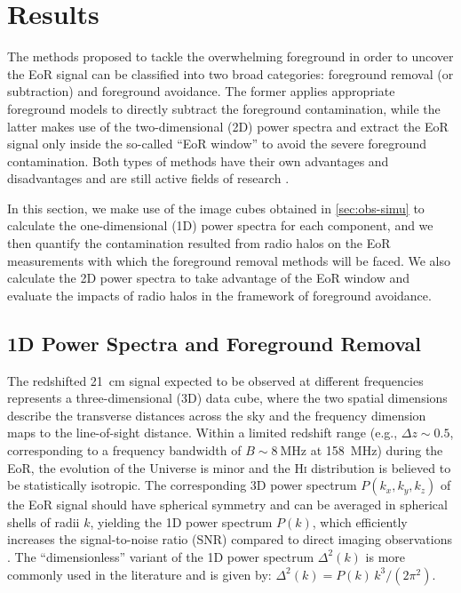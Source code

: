\documentclass[modern]{aastex62}
\newcommand{\Hi}{H\textsc{i}}
\begin{document}
\section{Results}
\label{sec:results}

{\color{cyan}%
The methods proposed to tackle the overwhelming foreground in order to
uncover the EoR signal can be classified into two broad categories:
foreground removal (or subtraction) and foreground avoidance.
The former applies appropriate foreground models to directly subtract
the foreground contamination, while the latter makes use of the
two-dimensional (2D) power spectra and extract the EoR signal only
inside the so-called \enquote{EoR window} to avoid the severe foreground
contamination.
Both types of methods have their own advantages and disadvantages and
are still active fields of research
\citep[see][and references therein]{chapman2016}.

In this section, we make use of the image cubes obtained in
\autoref{sec:obs-simu} to calculate the one-dimensional (1D) power
spectra for each component, and we then quantify the contamination
resulted from radio halos on the EoR measurements
with which the foreground removal methods will be faced.
We also calculate the 2D power spectra to take advantage of the EoR
window and evaluate the impacts of radio halos in the framework
of foreground avoidance.} %

\subsection{1D Power Spectra and Foreground Removal}
\label{sec:ps1d}

The redshifted 21~cm signal expected to be observed at different
frequencies represents a three-dimensional (3D) data cube, where the
two spatial dimensions describe the transverse distances across the sky
and the frequency dimension maps to the line-of-sight distance.
{\color{cyan}%
Within a limited redshift range (e.g., $\Delta z \sim 0.5$, corresponding
to a frequency bandwidth of $B \sim \SI{8}{\MHz}$ at \SI{158}{\MHz})
during the EoR, the evolution of the Universe is minor and the \Hi{}
distribution is believed to be statistically isotropic.}
The corresponding 3D power spectrum $P(k_x, k_y, k_z)$ of the EoR signal
should have spherical symmetry and can be averaged in spherical shells
of radii $k$, yielding the 1D power spectrum $P(k)$, which efficiently
increases the signal-to-noise ratio (SNR) compared to direct imaging
observations \citep{morales2004,morales2006,datta2010}.
The \enquote{dimensionless} variant of the 1D power spectrum
$\Delta^2(k)$ is more commonly used in the literature and is given by:
$\Delta^2(k) = P(k) \,k^3 / (2\pi^2)$.
\end{document}
